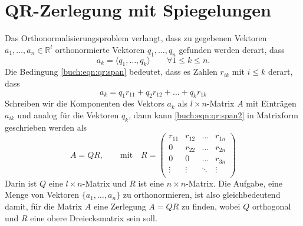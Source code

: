 %
%
%
\section{QR-Zerlegung mit Spiegelungen
\label{buch:section:qr}}
%
Das Orthonormalisierungsproblem verlangt, dass zu gegebenen Vektoren
$a_1,\dots,a_n\in \mathbb R^l$ orthonormierte Vektoren $q_1,\dots ,q_n$
gefunden werden derart, dass
\begin{equation}
a_k
=
\langle q_1,\dots,q_k \rangle
\qquad
\forall 1\le k\le n.
\label{buch:eqn:qr:span}
\end{equation}
Die Bedingung \eqref{buch:eqn:qr:span} bedeutet, dass es Zahlen $r_{ik}$
mit $i\le k$ derart, dass
\begin{equation}
a_k = q_1 r_{11} +  q_2 r_{12} + \dots + q_k r_{1k}
\label{buch:eqn:qr:span2}
\end{equation}
Schreiben wir die Komponenten des Vektors $a_k$ als $l\times n$-Matrix
$A$ mit Einträgen $a_{ik}$ und analog für die Vektoren $q_k$, dann kann
\eqref{buch:eqn:qr:span2} in Matrixform geschrieben werden als
\[
A=QR, \qquad\text{mit}\quad
R
=
\begin{pmatrix}
r_{11}&r_{12}&\dots &r_{1n}\\
0     &r_{22}&\dots &r_{2n}\\
0     &0     &\dots &r_{3n}\\
\vdots&\vdots&\ddots&\vdots\\
\end{pmatrix}
\]
Darin ist $Q$ eine $l\times n$-Matrix und $R$ ist eine $n\times n$-Matrix.
Die Aufgabe, eine Menge von Vektoren $\{a_1,\dots,a_n\}$ zu orthonormieren,
ist also gleichbedeutend damit, für die Matrix $A$ eine Zerlegung $A=QR$
zu finden, wobei $Q$ orthogonal und $R$ eine obere Dreiecksmatrix sein soll.
%

%
%
